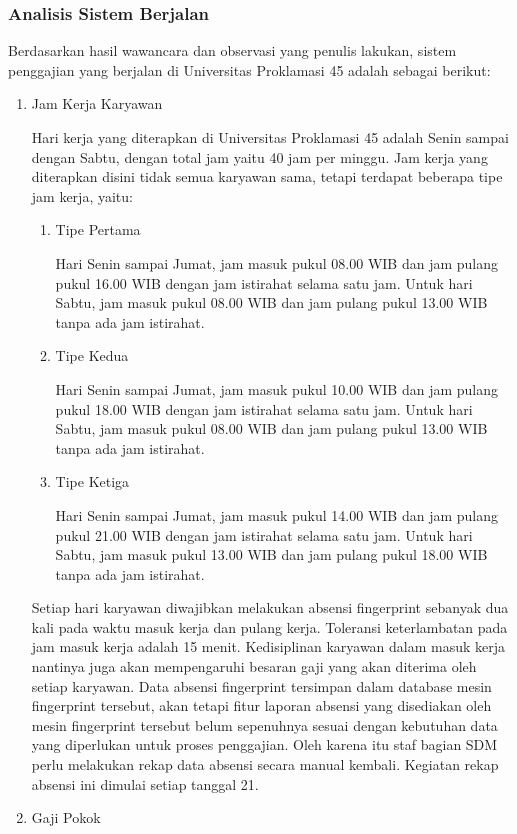 			\subsubsection{Analisis Sistem Berjalan}
				Berdasarkan hasil wawancara dan observasi yang penulis lakukan, sistem penggajian yang berjalan di Universitas Proklamasi 45 adalah sebagai berikut:
				\begin{enumerate}
					\itemsep0em
					\item Jam Kerja Karyawan
					
					Hari kerja yang diterapkan di Universitas Proklamasi 45 adalah Senin sampai dengan Sabtu, dengan total jam yaitu 40 jam per minggu. Jam kerja yang diterapkan disini tidak semua karyawan sama, tetapi terdapat beberapa tipe jam kerja, yaitu:
					\begin{enumerate}[label=\alph*.]
					    \itemsep0em
					    \item Tipe Pertama
					    
					    Hari Senin sampai Jumat, jam masuk pukul 08.00 WIB dan jam pulang pukul 16.00 WIB dengan jam istirahat selama satu jam. Untuk hari Sabtu, jam masuk pukul 08.00 WIB dan jam pulang pukul 13.00 WIB tanpa ada jam istirahat.
					    \item Tipe Kedua
					    
					    Hari Senin sampai Jumat, jam masuk pukul 10.00 WIB dan jam pulang pukul 18.00 WIB dengan jam istirahat selama satu jam. Untuk hari Sabtu, jam masuk pukul 08.00 WIB dan jam pulang pukul 13.00 WIB tanpa ada jam istirahat.
					    \item Tipe Ketiga
					    
					    Hari Senin sampai Jumat, jam masuk pukul 14.00 WIB dan jam pulang pukul 21.00 WIB dengan jam istirahat selama satu jam. Untuk hari Sabtu, jam masuk pukul 13.00 WIB dan jam pulang pukul 18.00 WIB tanpa ada jam istirahat.
					\end{enumerate}
					
					Setiap hari karyawan diwajibkan melakukan absensi fingerprint sebanyak dua kali pada waktu masuk kerja dan pulang kerja. Toleransi keterlambatan pada jam masuk kerja adalah 15 menit. Kedisiplinan karyawan dalam masuk kerja nantinya juga akan mempengaruhi besaran gaji yang akan diterima oleh setiap karyawan. Data absensi fingerprint tersimpan dalam database mesin fingerprint tersebut, akan tetapi fitur laporan absensi yang disediakan oleh mesin fingerprint tersebut belum sepenuhnya sesuai dengan kebutuhan data yang diperlukan untuk proses penggajian. Oleh karena itu staf bagian SDM perlu melakukan rekap data absensi secara manual kembali. Kegiatan rekap absensi ini dimulai setiap tanggal 21.
					\item Gaji Pokok
					

\end{enumerate}
